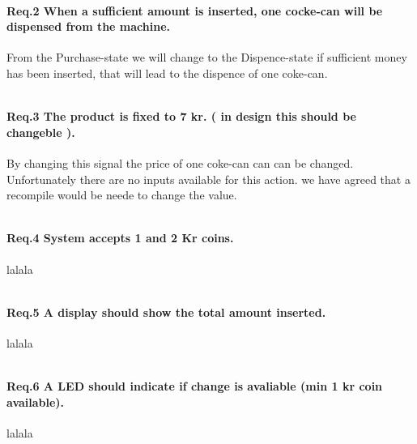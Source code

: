 \paragraph{Req.2 When a sufficient amount is inserted, one cocke-can will be dispensed from the machine.} From the Purchase-state we will change to the Dispence-state if sufficient money has been inserted, that will lead to the dispence of one coke-can.

\begin{lstlisting}[caption={[VHDL]eks. text }]

\end{lstlisting}
  
\paragraph{Req.3 The product is fixed to 7 kr. ( in design this should be changeble ).} By changing this signal the price of one coke-can can can be changed. Unfortunately there are no inputs available for this action. we have agreed that a recompile would be neede to change the value. 
\begin{lstlisting}[caption={[VHDL]eks. text }]

\end{lstlisting}


\paragraph{Req.4 System accepts 1 and 2 Kr coins.}
lalala
\begin{lstlisting}[caption={[VHDL]eks. text }]

\end{lstlisting}
 

\paragraph{Req.5 A display should show the total amount inserted.}
lalala
\begin{lstlisting}[caption={[VHDL]eks. text }]

\end{lstlisting}
  

\paragraph{Req.6 A LED should indicate if change is avaliable (min 1 kr coin available).}
lalala
\begin{lstlisting}[caption={[VHDL]eks. text }]

\end{lstlisting}
 

